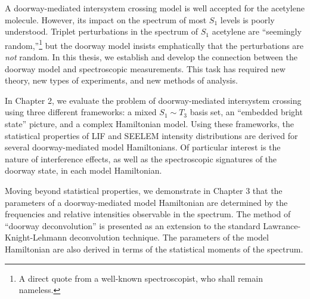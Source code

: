
A doorway-mediated intersystem crossing model is well accepted for the
acetylene molecule.  However, its impact on the spectrum of most $S_1$
levels is poorly understood.  Triplet perturbations in the spectrum of
$S_1$ acetylene are ``seemingly random,''\footnote{A direct quote from
  a well-known spectroscopist, who shall remain nameless.} but the
doorway model insists emphatically that the perturbations are
\emph{not} random.  In this thesis, we establish and develop the
connection between the doorway model and spectroscopic measurements.
This task has required new theory, new types of experiments, and new
methods of analysis.


In Chapter 2, we evaluate the problem of doorway-mediated intersystem
crossing using three different frameworks: a mixed $S_1 \sim T_3$
basis set, an ``embedded bright state'' picture, and a complex
Hamiltonian model.  Using these frameworks, the statistical properties
of LIF and SEELEM intensity distributions are derived for several
doorway-mediated model Hamiltonians.  Of particular interest is the
nature of interference effects, as well as the spectroscopic
signatures of the doorway state, in each model Hamiltonian.

Moving beyond statistical properties, we demonstrate in Chapter 3 that
the parameters of a doorway-mediated model Hamiltonian are determined
by the frequencies and relative intensities observable in the
spectrum.  The method of ``doorway deconvolution'' is presented as an
extension to the standard Lawrance-Knight-Lehmann deconvolution
technique.  The parameters of the model Hamiltonian are also derived
in terms of the statistical moments of the spectrum.


